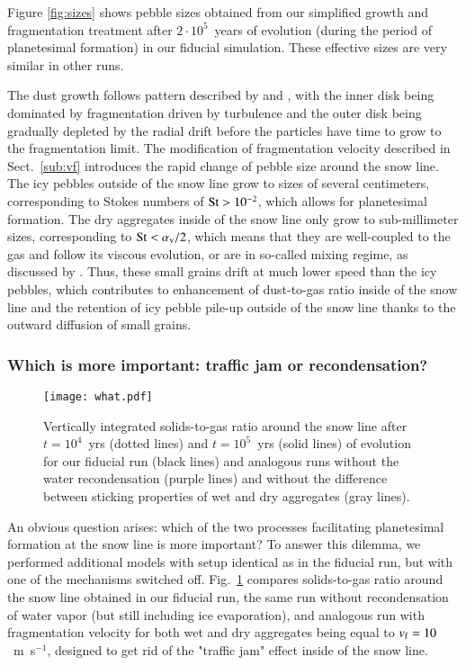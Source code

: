 \documentclass{aa}
\begin{document}
Figure \ref{fig:sizes} shows pebble sizes obtained from our simplified growth and fragmentation treatment after $2\cdot10^5$~years of evolution (during the period of planetesimal formation) in our fiducial simulation. These effective sizes are very similar in other runs.

The dust growth follows pattern described by \citet{2012A&A...539A.148B} and \citet{2016A&A...594A.105D}, with the inner disk being dominated by fragmentation driven by turbulence and the outer disk being gradually depleted by the radial drift before the particles have time to grow to the fragmentation limit. The modification of fragmentation velocity described in Sect.~\ref{sub:vf} introduces the rapid change of pebble size around the snow line. The icy pebbles outside of the snow line grow to sizes of several centimeters, corresponding to Stokes numbers of ${\rm St}>10^{-2}$, which allows for planetesimal formation. The dry aggregates inside of the snow line only grow to sub-millimeter sizes,  corresponding to ${\rm St}<\alpha_{\rm v}/2$, which means that they are well-coupled to the gas and follow its viscous evolution, or are in so-called mixing regime, as discussed by \citet{2012A&A...539A.148B}. Thus, these small grains drift at much lower speed than the icy pebbles, which contributes to enhancement of dust-to-gas ratio inside of the snow line and the retention of icy pebble pile-up outside of the snow line thanks to the outward diffusion of small grains.  

\subsubsection{Which is more important: traffic jam or recondensation?}\label{sub:what}

\begin{figure}
   \centering
   \texttt{[image: what.pdf]}
      \caption{Vertically integrated solids-to-gas ratio around the snow line after $t=10^4$~yrs (dotted lines) and $t=10^5$~yrs (solid lines) of evolution for our fiducial run (black lines) and analogous runs without the water recondensation (purple lines) and without the difference between sticking properties of wet and dry aggregates (gray lines).}
      \label{fig:what}
\end{figure}

An obvious question arises: which of the two processes facilitating planetesimal formation at the snow line is more important? To answer this dilemma, we performed additional models with setup identical as in the fiducial run, but with one of the mechanisms switched off. Fig.~\ref{fig:what} compares solids-to-gas ratio around the snow line obtained in our fiducial run, the same run without recondensation of water vapor (but still including ice evaporation), and analogous run with fragmentation velocity for both wet and dry aggregates being equal to $v_{\rm f}=10$~m~s$^{-1}$, designed to get rid of the "traffic jam" effect inside of the snow line.
\end{document}
